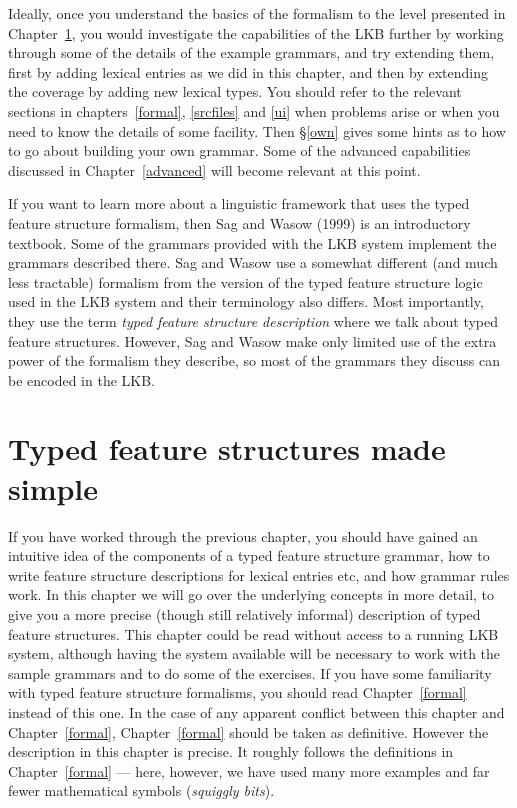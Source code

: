 \documentclass[12pt]{report}
\newcommand{\newterm}[1]{{\it #1}}
\begin{document}
Ideally, once you understand the basics of the formalism to the level presented
in Chapter~\ref{easy}, you would investigate the capabilities of the LKB
further by working through some of the details of the example grammars, and try
extending them, first by adding lexical entries as we did in this chapter, and
then by extending the coverage by adding new lexical types.  You should refer
to the relevant sections in chapters~\ref{formal}, \ref{srcfiles} and \ref{ui}
when problems arise or when you need to know the details of some facility.
Then \S\ref{own} gives some hints as to how to go about building your own
grammar.  Some of the advanced capabilities discussed in Chapter~\ref{advanced}
will become relevant at this point.

If you want to learn more about a linguistic framework that uses the typed
feature structure formalism, then Sag and Wasow (1999) is an introductory
textbook.  Some of the grammars provided with the LKB system implement the
grammars described there.  Sag and Wasow use a somewhat different (and much
less tractable) formalism from the version of the typed feature structure logic
used in the LKB system and their terminology also differs.  Most importantly,
they use the term \newterm{typed feature structure description} where we talk
about typed feature structures.  However, Sag and Wasow make only limited
use of the extra power of the formalism they describe, so most of the grammars
they discuss can be encoded in the LKB.

\chapter{Typed feature structures made simple}
\label{easy}

If you have worked through the previous chapter, you should have
gained an intuitive idea of the components of a typed feature structure
grammar, how to write feature structure descriptions for lexical entries
etc, and how grammar rules work.  In this chapter we will go over the
underlying concepts in more detail, to give you a more precise (though 
still relatively informal)
description of typed feature structures.
This chapter could be read without access to a running
LKB system, although having the system available will be necessary to
work with the sample grammars and to do some of the exercises.  
If you have some familiarity
with typed feature structure formalisms, you should
read Chapter~\ref{formal} instead of this one.  In the case
of any apparent conflict between this chapter and Chapter~\ref{formal},
Chapter~\ref{formal} should be taken as definitive.  
However the description in this chapter is precise.  It roughly follows
the definitions in Chapter~\ref{formal} --- here, however,
we have used many more examples and far fewer mathematical symbols
(\newterm{squiggly bits}).
\end{document}
